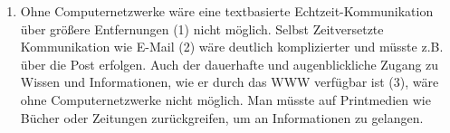 \documentclass[a4paper,
			llpt,
			solution,
			accentcolor=tud2d,
			colorbacktitle
			]
			{tudexercise}
\begin{document}
\begin{enumerate}
\item
{}
Ohne Computernetzwerke wäre eine textbasierte Echtzeit-Kommunikation über größere Entfernungen (1) nicht möglich. Selbst Zeitversetzte Kommunikation wie E-Mail (2) wäre deutlich komplizierter und müsste z.B. über die Post erfolgen. Auch der dauerhafte und augenblickliche Zugang zu Wissen und Informationen, wie er durch das WWW verfügbar ist (3), wäre ohne Computernetzwerke nicht möglich. Man müsste auf Printmedien wie Bücher oder Zeitungen zurückgreifen, um an Informationen zu gelangen.

\end{enumerate}
\end{document}
